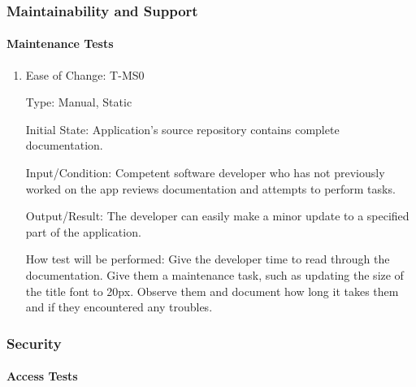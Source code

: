 \documentclass[12pt, titlepage]{article}
\begin{document}
\subsubsection{Maintainability and Support}
		
\paragraph{Maintenance Tests}

\begin{enumerate}

\item{Ease of Change: T-MS0\\}

Type: Manual, Static
					
Initial State: Application's source repository contains complete documentation.
					
Input/Condition: Competent software developer who has not previously worked on the app reviews documentation and attempts to perform tasks.
					
Output/Result: The developer can easily make a minor update to a specified part of the application.
					
How test will be performed: Give the developer time to read through the documentation. Give them a maintenance task, such as updating the size of the title font to 20px. Observe them and document how long it takes them and if they encountered any troubles.
\end{enumerate}

\subsubsection{Security}
		
\paragraph{Access Tests}
\end{document}
